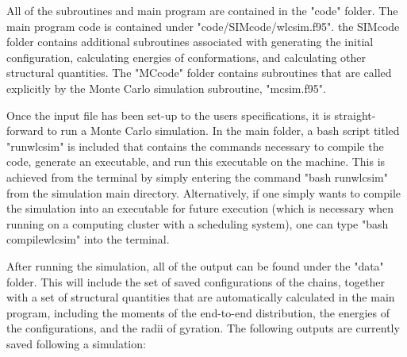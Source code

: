 \documentclass[english]{article}
\begin{document}
All of the subroutines and main program are contained in the "code" folder. The main program code is contained under "code/SIMcode/wlcsim.f95". the SIMcode folder contains additional subroutines associated with generating the initial configuration, calculating energies of conformations, and calculating other structural quantities. The "MCcode" folder contains subroutines that are called explicitly by the Monte Carlo simulation subroutine, "mcsim.f95".

Once the input file has been set-up to the users specifications, it is straight-forward to run a Monte Carlo simulation. In the main folder, a bash script titled "runwlcsim" is included that contains the commands necessary to compile the code, generate an executable, and run this executable on the machine. This is achieved from the terminal by simply entering the command "bash runwlcsim" from the simulation main directory. Alternatively, if one simply wants to compile the simulation into an executable for future execution (which is necessary when running on a computing cluster with a scheduling system), one can type "bash compilewlcsim" into the terminal.

After running the simulation, all of the output can be found under the "data" folder. This will include the set of saved configurations of the chains, together with a set of structural quantities that are automatically calculated in the main program, including the moments of the end-to-end distribution, the energies of the configurations, and the radii of gyration. The following outputs are currently saved following a simulation:\\
\end{document}
